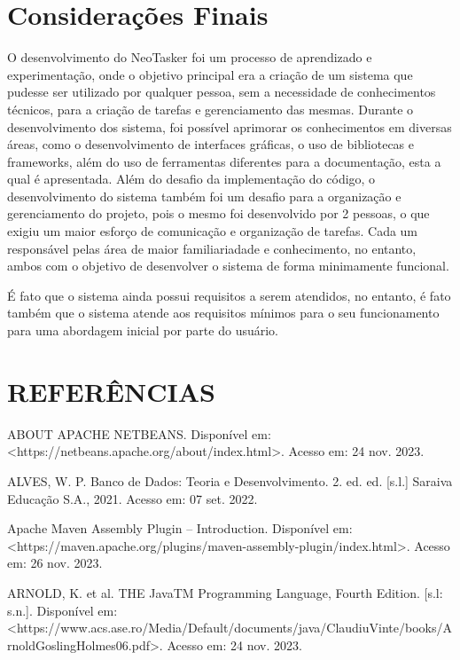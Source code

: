 \documentclass[a4paper,12pt]{article}
\begin{document}
\pagebreak
\section{Considerações Finais}
O desenvolvimento do NeoTasker foi um processo de aprendizado e experimentação, onde o objetivo principal era a criação de um sistema que pudesse ser utilizado
por qualquer pessoa, sem a necessidade de conhecimentos técnicos, para a criação de tarefas e gerenciamento das mesmas. Durante o desenvolvimento dos sistema,
foi possível aprimorar os conhecimentos em diversas áreas, como o desenvolvimento de interfaces gráficas, o uso de bibliotecas e frameworks, além do uso de ferramentas 
diferentes para a documentação, esta a qual é apresentada. Além do desafio da implementação do código, o desenvolvimento do sistema também foi um desafio para a 
organização e gerenciamento do projeto, pois o mesmo foi desenvolvido por 2 pessoas, o que exigiu um maior esforço de comunicação e organização de tarefas. Cada um responsável 
pelas área de maior familiariadade e conhecimento, no entanto, ambos com o objetivo de desenvolver o sistema de forma minimamente funcional. 

É fato que o sistema ainda possui requisitos a serem atendidos, no entanto, é fato também que o sistema atende aos requisitos mínimos para o seu funcionamento para 
uma abordagem inicial por parte do usuário.

\pagebreak
\centering \section*{REFERÊNCIAS}
\vspace{1cm}

\raggedright
\noindent ABOUT APACHE NETBEANS. Disponível em: <https://netbeans.apache.org/about/index.html>. Acesso em: 24 nov. 2023. \linebreak

\noindent ALVES, W. P. Banco de Dados: Teoria e Desenvolvimento. 2. ed. ed. [s.l.] Saraiva Educação S.A., 2021. Acesso em: 07 set. 2022. \linebreak 

\noindent Apache Maven Assembly Plugin – Introduction. Disponível em: <https://maven.apache.org/plugins/maven-assembly-plugin/index.html>. 
Acesso em: 26 nov. 2023. \linebreak

\noindent ARNOLD, K. et al. THE JavaTM Programming Language, Fourth Edition. [s.l: s.n.]. 
Disponível em: <https://www.acs.ase.ro/Media/Default/documents/java/ClaudiuVinte/books/ArnoldGoslingHolmes06.pdf>. 
Acesso em: 24 nov. 2023. \linebreak
\end{document}

